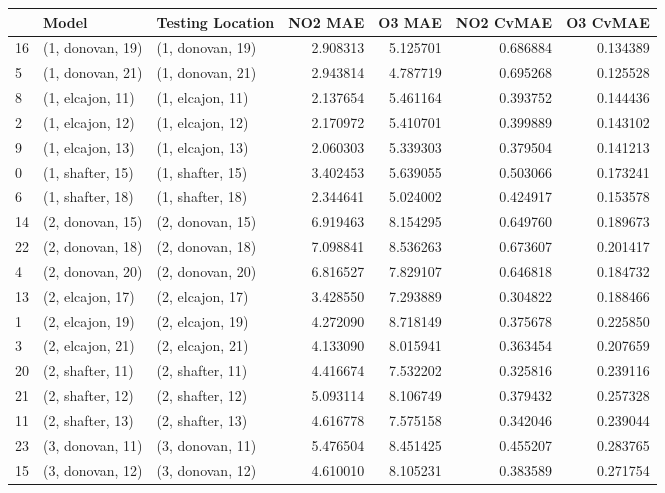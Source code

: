 \begin{tabular}{lllrrrr}
\toprule
{} &             Model &  Testing Location &   NO2 MAE &    O3 MAE &  NO2 CvMAE &  O3 CvMAE \\
\midrule
16 &  (1, donovan, 19) &  (1, donovan, 19) &  2.908313 &  5.125701 &   0.686884 &  0.134389 \\
5  &  (1, donovan, 21) &  (1, donovan, 21) &  2.943814 &  4.787719 &   0.695268 &  0.125528 \\
8  &  (1, elcajon, 11) &  (1, elcajon, 11) &  2.137654 &  5.461164 &   0.393752 &  0.144436 \\
2  &  (1, elcajon, 12) &  (1, elcajon, 12) &  2.170972 &  5.410701 &   0.399889 &  0.143102 \\
9  &  (1, elcajon, 13) &  (1, elcajon, 13) &  2.060303 &  5.339303 &   0.379504 &  0.141213 \\
0  &  (1, shafter, 15) &  (1, shafter, 15) &  3.402453 &  5.639055 &   0.503066 &  0.173241 \\
6  &  (1, shafter, 18) &  (1, shafter, 18) &  2.344641 &  5.024002 &   0.424917 &  0.153578 \\
14 &  (2, donovan, 15) &  (2, donovan, 15) &  6.919463 &  8.154295 &   0.649760 &  0.189673 \\
22 &  (2, donovan, 18) &  (2, donovan, 18) &  7.098841 &  8.536263 &   0.673607 &  0.201417 \\
4  &  (2, donovan, 20) &  (2, donovan, 20) &  6.816527 &  7.829107 &   0.646818 &  0.184732 \\
13 &  (2, elcajon, 17) &  (2, elcajon, 17) &  3.428550 &  7.293889 &   0.304822 &  0.188466 \\
1  &  (2, elcajon, 19) &  (2, elcajon, 19) &  4.272090 &  8.718149 &   0.375678 &  0.225850 \\
3  &  (2, elcajon, 21) &  (2, elcajon, 21) &  4.133090 &  8.015941 &   0.363454 &  0.207659 \\
20 &  (2, shafter, 11) &  (2, shafter, 11) &  4.416674 &  7.532202 &   0.325816 &  0.239116 \\
21 &  (2, shafter, 12) &  (2, shafter, 12) &  5.093114 &  8.106749 &   0.379432 &  0.257328 \\
11 &  (2, shafter, 13) &  (2, shafter, 13) &  4.616778 &  7.575158 &   0.342046 &  0.239044 \\
23 &  (3, donovan, 11) &  (3, donovan, 11) &  5.476504 &  8.451425 &   0.455207 &  0.283765 \\
15 &  (3, donovan, 12) &  (3, donovan, 12) &  4.610010 &  8.105231 &   0.383589 &  0.271754 \\

\end{tabular}
